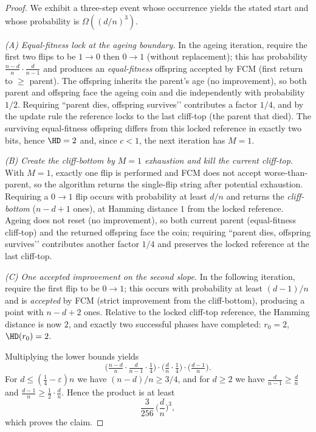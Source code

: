 \begin{proof}
	We exhibit a three-step event whose occurrence yields the stated start and whose probability is $\Omega((d/n)^3)$.
	
	\emph{(A) Equal-fitness lock at the ageing boundary.} In the ageing iteration, require the first two flips to be $1\!\to 0$ then $0\!\to 1$ (without replacement); this has probability $\frac{n-d}{n}\cdot\frac{d}{n-1}$ and produces an \emph{equal-fitness} offspring accepted by FCM (first return to $\ge$ parent). The offspring inherits the parent’s age (no improvement), so both parent and offspring face the ageing coin and die independently with probability $1/2$. Requiring “parent dies, offspring survives’’ contributes a factor $1/4$, and by the update rule the reference locks to the last cliff-top (the parent that died). The surviving equal-fitness offspring differs from this locked reference in exactly two bits, hence $\HD=2$ and, since $c<1$, the next iteration has $M=1$.
	
	\emph{(B) Create the cliff-bottom by $M{=}1$ exhaustion and kill the current cliff-top.} With $M=1$, exactly one flip is performed and FCM does not accept worse-than-parent, so the algorithm returns the single-flip string after potential exhaustion. Requiring a $0\!\to 1$ flip occurs with probability at least $d/n$ and returns the \emph{cliff-bottom} ($n-d+1$ ones), at Hamming distance $1$ from the locked reference. Ageing does not reset (no improvement), so both current parent (equal-fitness cliff-top) and the returned offspring face the coin; requiring “parent dies, offspring survives’’ contributes another factor $1/4$ and preserves the locked reference at the last cliff-top.
	
	\emph{(C) One accepted improvement on the second slope.} In the following iteration, require the first flip to be $0\!\to 1$; this occurs with probability at least $(d-1)/n$ and is \emph{accepted} by FCM (strict improvement from the cliff-bottom), producing a point with $n-d+2$ ones. Relative to the locked cliff-top reference, the Hamming distance is now $2$, and exactly two successful phases have completed: $r_0=2$, $\HD(r_0)=2$.
	
	Multiplying the lower bounds yields
	\[
	\Big(\tfrac{n-d}{n}\cdot\tfrac{d}{n-1}\cdot\tfrac14\Big)\cdot
	\Big(\tfrac{d}{n}\cdot\tfrac14\Big)\cdot
	\Big(\tfrac{d-1}{n}\Big).
	\]
	For $d\le(\tfrac14-\varepsilon)n$ we have $(n-d)/n\ge 3/4$, and for $d\ge 2$ we have $\tfrac{d}{n-1}\ge\tfrac{d}{n}$ and $\tfrac{d-1}{n}\ge \tfrac12\cdot\tfrac{d}{n}$. Hence the product is at least
	\[
	\frac{3}{256}\,\Big(\frac{d}{n}\Big)^{\!3},
	\]
	which proves the claim.
\end{proof}



